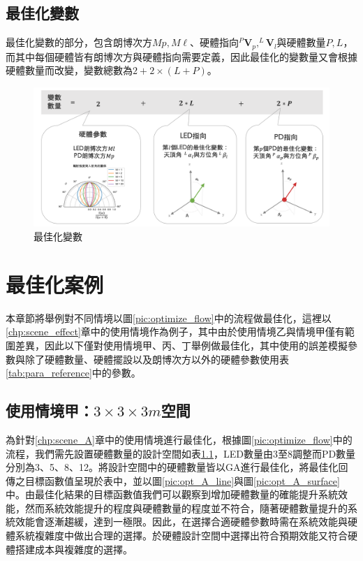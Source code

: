     \subsection{最佳化變數}
    \label{chp:optimize_variable}

    最佳化變數的部分，包含朗博次方$Mp,M\ell$、硬體指向$^{P}\boldsymbol{V}_p,^{L}\boldsymbol{V}_l$與硬體數量$P,L$，而其中每個硬體皆有朗博次方與硬體指向需要定義，因此最佳化的變數量又會根據硬體數量而改變，變數總數為$2+2\times(L+P)$。


    \begin{figure}[htpb]
        \centering
        \includegraphics[width=15cm]{ch5pic/optimize_variable.png}
        \caption{最佳化變數}
        \label{pic:optimize_variable}
    \end{figure}



\section{最佳化案例}
\label{chp:optimize_case}

本章節將舉例對不同情境以圖\ref{pic:optimize_flow}中的流程做最佳化，這裡以\ref{chp:scene_effect}章中的使用情境作為例子，其中由於使用情境乙與情境甲僅有範圍差異，因此以下僅對使用情境甲、丙、丁舉例做最佳化，其中使用的誤差模擬參數與除了硬體數量、硬體擺設以及朗博次方以外的硬體參數使用表\ref{tab:para_reference}中的參數。

    \subsection{使用情境甲：$3\times 3\times 3m$空間}
    \label{chp:optimiza_A}

    為針對\ref{chp:scene_A}章中的使用情境進行最佳化，根據圖\ref{pic:optimize_flow}中的流程，我們需先設置硬體數量的設計空間如表\ref{chp:optimiza_A}，LED數量由3至8調整而PD數量分別為3、5、8、12。將設計空間中的硬體數量皆以GA進行最佳化，將最佳化回傳之目標函數值呈現於表中，並以圖\ref{pic:opt_A_line}與圖\ref{pic:opt_A_surface}中。由最佳化結果的目標函數值我們可以觀察到增加硬體數量的確能提升系統效能，然而系統效能提升的程度與硬體數量的程度並不符合，隨著硬體數量提升的系統效能會逐漸趨緩，達到一極限。因此，在選擇合適硬體參數時需在系統效能與硬體系統複雜度中做出合理的選擇。於硬體設計空間中選擇出符合預期效能又符合硬體搭建成本與複雜度的選擇。

